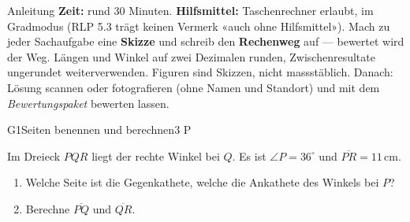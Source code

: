 \documentclass[11pt]{article}
\begin{document}

\begin{lpinfo}{Anleitung}
\textbf{Zeit:} rund 30 Minuten. \textbf{Hilfsmittel:} Taschenrechner erlaubt, im Gradmodus (RLP 5.3 trägt keinen Vermerk «auch ohne Hilfsmittel»).
Mach zu jeder Sachaufgabe eine \textbf{Skizze} und schreib den \textbf{Rechenweg} auf — bewertet wird der Weg. Längen und Winkel
auf zwei Dezimalen runden, Zwischenresultate ungerundet weiterverwenden. Figuren sind Skizzen, nicht massstäblich.
Danach: Lösung scannen oder fotografieren (ohne Namen und Standort) und mit dem \emph{Bewertungspaket} bewerten lassen.
\end{lpinfo}


\begin{lpaufgabe}{G1}{Seiten benennen und berechnen}{3 P}
\begin{minipage}[t]{0.55\linewidth}\vspace{0pt}
Im Dreieck $PQR$ liegt der rechte Winkel bei $Q$. Es ist $\angle P = 36^\circ$ und $\overline{PR} = 11\,\text{cm}$.
\begin{enumerate}[label=(\alph*),leftmargin=*,itemsep=2pt]
\item Welche Seite ist die Gegenkathete, welche die Ankathete des Winkels bei $P$?
\item Berechne $\overline{PQ}$ und $\overline{QR}$.
\end{enumerate}
\end{minipage}\hfill
\begin{minipage}[t]{0.40\linewidth}\vspace{0pt}\centering
{}
\end{minipage}
\end{lpaufgabe}
\end{document}
